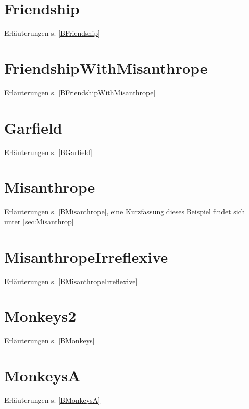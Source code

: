 \documentclass[a4paper, 11pt]{book}
\begin{document}
{\newpage


\section{Friendship} Erläuterungen s. \ref{BFriendship}
\label{Friendship}

\newpage

\section{FriendshipWithMisanthrope} Erläuterungen s. \ref{BFriendshipWithMisanthrope}
\label{FriendshipWithMisanthrope}

\newpage

\section{Garfield}  Erläuterungen s. \ref{BGarfield}
\label{Garfield}


\newpage

\section{Misanthrope} Erläuterungen s. \ref{BMisanthrope}, eine Kurzfassung dieses Beispiel findet sich unter \ref{sec:Misanthrop}
\label{Misanthrope}

\newpage



\section{MisanthropeIrreflexive} Erläuterungen s. \ref{BMisanthropeIrreflexive}
\label{MisanthropeIrreflexive}

\newpage

\section{Monkeys2} Erläuterungen s. \ref{BMonkeys}
\label{Monkeys2}


\newpage

\section{MonkeysA} Erläuterungen s. \ref{BMonkeysA}
\label{MonkeysA}


}
\end{document}
